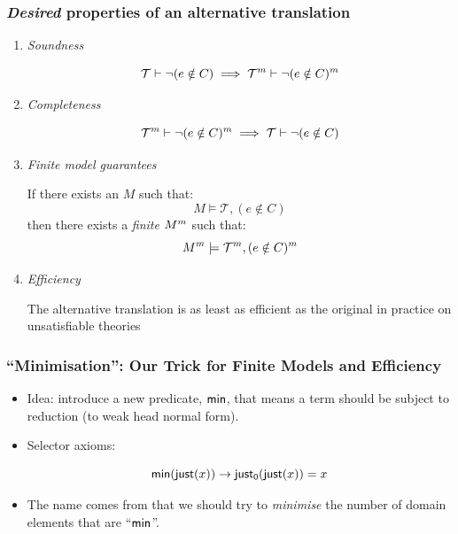 \documentclass[serif,professionalfont]{beamer}
\begin{document}
\begin{frame}[fragile]
  \frametitle{\emph{Desired} properties of an alternative translation}

  \begin{enumerate}
    \item \emph{Soundness}

      $$\mathcal{T} \vdash \neg (e \notin C) \implies
        \mathcal{T}^{m} \vdash \neg (e \notin C)^{m}$$

    \item \emph{Completeness}

      $$\mathcal{T}^{m} \vdash \neg (e \notin C)^{m} \implies
        \mathcal{T} \vdash \neg (e \notin C)$$

    \item \emph{Finite model guarantees}

      If there exists an $M$ such that:
      $$M \models \mathcal{T} , (e \notin C)$$
      then there exists a \emph{finite} $M^{m}$ such that:
      $$M^{m} \models \mathcal{T}^{m} , (e \notin C)^{m}$$

    \item \emph{Efficiency}

      The alternative translation is as least as efficient as the
      original in practice on unsatisfiable theories
  \end{enumerate}

\end{frame}

\begin{frame}
  \frametitle{``Minimisation'': Our Trick for Finite Models and Efficiency }

  \begin{itemize}
    \item Idea: introduce a new predicate, $\mathsf{min}$, that means a term
      should be subject to reduction (to weak head normal form).

    \item Selector axioms:

      $$
        \mathsf{min}(\mathsf{just}(x)) \to \mathsf{just_0}(\mathsf{just}(x)) = x
      $$

    \item The name comes from that we should try to \emph{minimise}
      the number of domain elements that are ``$\mathsf{min}$''.
  \end{itemize}

\end{frame}
\end{document}
